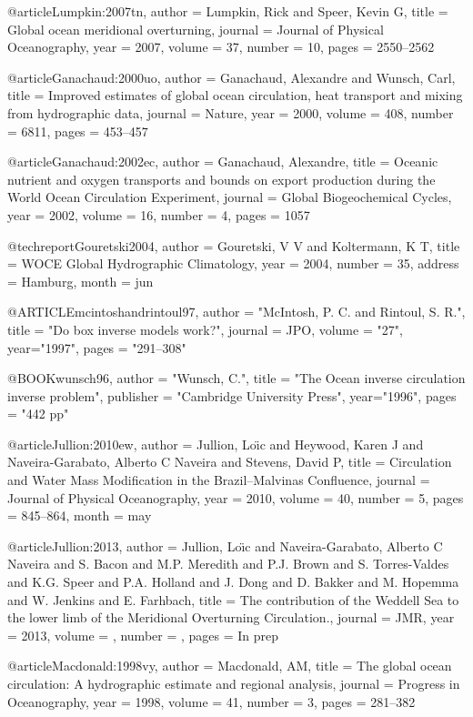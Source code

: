 @article{Lumpkin:2007tn,
author = {Lumpkin, Rick and Speer, Kevin G},
title = {{Global ocean meridional overturning}},
journal = {Journal of Physical Oceanography},
year = {2007},
volume = {37},
number = {10},
pages = {2550--2562}
}

@article{Ganachaud:2000uo,
author = {Ganachaud, Alexandre and Wunsch, Carl},
title = {{Improved estimates of global ocean circulation, heat transport and mixing from hydrographic data}},
journal = {Nature},
year = {2000},
volume = {408},
number = {6811},
pages = {453--457}
}

@article{Ganachaud:2002ec,
author = {Ganachaud, Alexandre},
title = {{Oceanic nutrient and oxygen transports and bounds on export production during the World Ocean Circulation Experiment}},
journal = {Global Biogeochemical Cycles},
year = {2002},
volume = {16},
number = {4},
pages = {1057}
}

@techreport{Gouretski2004,
author = {Gouretski, V V and Koltermann, K T},
title = {{WOCE Global Hydrographic Climatology}},
year = {2004},
number = {35},
address = {Hamburg},
month = jun
}

@ARTICLE{mcintoshandrintoul97,
author = "McIntosh, P. C. and Rintoul, S. R.",
title = "{Do box inverse models work?}",
journal = JPO,
volume = "27",
year="1997",
pages = "291--308" }

@BOOK{wunsch96,
author = "Wunsch, C.",
title = "{The Ocean inverse circulation inverse problem}",
publisher = "Cambridge University Press",
year="1996",
pages = "442 pp" 
}

@article{Jullion:2010ew,
author = {Jullion, Lo{\"\i}c and Heywood, Karen J and Naveira-Garabato, Alberto C Naveira and Stevens, David P},
title = {{Circulation and Water Mass Modification in the Brazil--Malvinas Confluence}},
journal = {Journal of Physical Oceanography},
year = {2010},
volume = {40},
number = {5},
pages = {845--864},
month = may
}

@article{Jullion:2013,
author = {Jullion, Lo{\"\i}c and Naveira-Garabato, Alberto C Naveira and S. Bacon and M.P. Meredith and P.J. Brown and S. Torres-Valdes and K.G. Speer and P.A. Holland and J. Dong and D. Bakker and M. Hopemma and W. Jenkins and E. Farhbach},
title = {{The contribution of the Weddell Sea to the lower limb of the Meridional Overturning Circulation.}},
journal = JMR,
year = {2013},
volume = {},
number = {},
pages = {In prep}
}

@article{Macdonald:1998vy,
author = {Macdonald, AM},
title = {{The global ocean circulation: A hydrographic estimate and regional analysis}},
journal = {Progress in Oceanography},
year = {1998},
volume = {41},
number = {3},
pages = {281--382}
}

